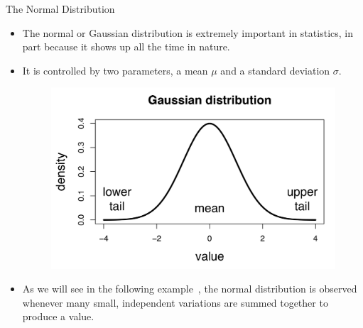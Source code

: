 \documentclass[handout]{beamer}
\begin{document}
 

\begin{frame}{The Normal Distribution}

\scriptsize{
\begin{itemize}
 \item  The normal or Gaussian distribution is extremely important in statistics, in part because it shows up all the time in nature. 
 \item It is controlled by two parameters, a mean $\mu$ and a standard deviation $\sigma$. 
 
 \begin{figure}[h!]
	\centering
	\includegraphics[scale=0.13]{pics/gaussian.jpg}
\end{figure}
 
 \item As we will see in the following example~\cite{mcelreath2020statistical}, the normal distribution is observed whenever many small, independent variations are summed together to produce a value.
 \end{itemize}}
 
 
 \end{frame}
\end{document}
